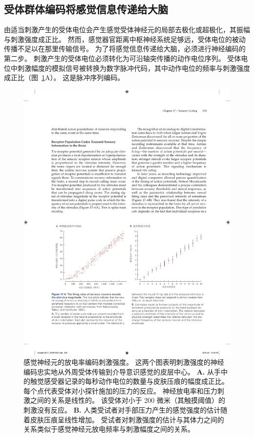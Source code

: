 \subsection{受体群体编码将感觉信息传递给大脑}

由适当刺激产生的受体电位会产生感觉受体神经元的局部去极化或超极化，其振幅与刺激强度成正比。
然而，感觉器官距离中枢神经系统足够远，受体电位的被动传播不足以在那里传输信号。
为了将感觉信息传递给大脑，必须进行神经编码的第二步。
刺激产生的受体电位必须转化为可沿轴突传播的动作电位序列。
受体电位中刺激幅度的模拟信号被转换为数字脉冲代码，其中动作电位的频率与刺激强度成正比（图~\ref{fig:17_6}A）。
这是脉冲序列编码。


\begin{figure}[htbp]
	\centering
	\includegraphics[width=1.0\linewidth]{chap17/fig_17_6}
	\caption{感觉神经元的放电率编码刺激强度。 
		这两个图表明刺激强度的神经编码忠实地从外周受体传输到介导意识感觉的皮层中心\cite{mountcastle1966neural}。
		\textbf{A.} 从手中的触觉感受器记录的每秒动作电位的数量与皮肤压痕的幅度成正比。 
		每个点代表受体对小探针施加的压力的反应。 
		神经放电率和压力刺激之间的关系是线性的。 
		该受体对小于 200 微米（其触摸阈值）的刺激没有反应。 
		\textbf{B.} 人类受试者对手部压力产生的感觉强度的估计随着皮肤压痕呈线性增加。 
		受试者对刺激强度的估计与其体力之间的关系类似于感觉神经元放电频率与刺激幅度之间的关系。}
	\label{fig:17_6}
\end{figure}



